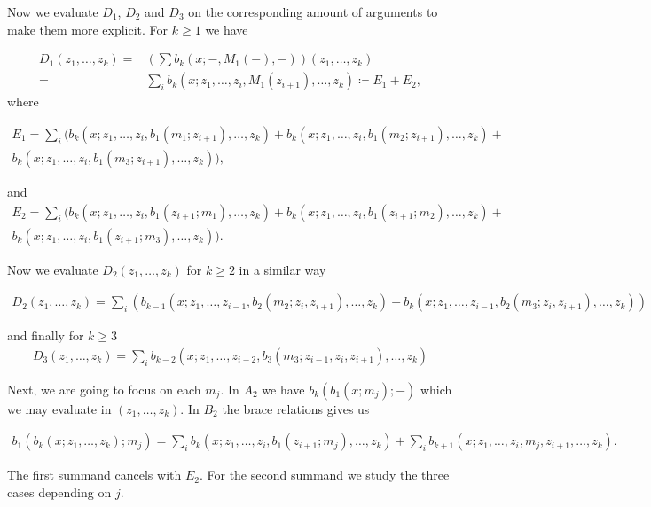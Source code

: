 \documentclass[twoside]{article}
\begin{document}
Now we evaluate $D_1$, $D_2$ and $D_3$ on the corresponding amount of arguments to make them more explicit. For $k\geq 1$ we have

\begin{align*}
D_1(z_1,\dots, z_{k})=&(\sum b_k(x;-,M_1(-),-))(z_1,\dots, z_{k})\\
=&\sum_i b_k(x;z_1,\dots, z_i,M_1(z_{i+1}),\dots, z_{k})\coloneqq
E_1+E_2,
\end{align*}
where

\begin{multline*}
E_1=\sum_i(b_k(x;z_1,\dots, z_i,b_1(m_1;z_{i+1}),\dots, z_{k})+b_k(x;z_1,\dots, z_i,b_1(m_2;z_{i+1}),\dots, z_{k})+\\b_k(x;z_1,\dots, z_i,b_1(m_3;z_{i+1}),\dots, z_{k})),
\end{multline*}

 and
 \begin{multline*}
E_2=\sum_i(b_k(x;z_1,\dots, z_i,b_1(z_{i+1};m_1),\dots, z_{k})+b_k(x;z_1,\dots, z_i,b_1(z_{i+1};m_2),\dots, z_{k})+\\ b_k(x;z_1,\dots, z_i,b_1(z_{i+1};m_3),\dots, z_{k})).
\end{multline*}

Now we evaluate $D_2(z_1,\dots, z_{k})$ for $k\geq 2$ in a similar way

\begin{align*}
D_2(z_1,\dots, z_{k})=\sum_i(b_{k-1}(x;z_1,\dots, z_{i-1}, b_2(m_2;z_i,z_{i+1}),\dots,z_{k})+b_k(x;z_1,\dots, z_{i-1}, b_2(m_3;z_i,z_{i+1}),\dots,z_{k}))
\end{align*}

and finally for $k\geq 3$
\begin{align*}
D_3(z_1,\dots, z_{k})=\sum_ib_{k-2}(x;z_1,\dots, z_{i-2}, b_3(m_3;z_{i-1},z_i,z_{i+1}),\dots,z_{k})
\end{align*}

Next, we are going to focus on each $m_j$. In $A_2$ we have $b_k(b_1(x;m_j);-)$ which we may evaluate in $(z_1,\dots, z_k)$. In $B_2$ the brace relations gives us

\begin{align*}
b_1(b_k(x;z_1,\dots, z_k);m_j)=\sum_ib_k(x;z_1,\dots, z_i, b_1(z_{i+1};m_j),\dots, z_k)+\sum_ib_{k+1}(x;z_1,\dots, z_i,m_j,z_{i+1},\dots, z_k).
\end{align*}

The first summand cancels with $E_2$. For the second summand we study the three cases depending on $j$.
\end{document}
